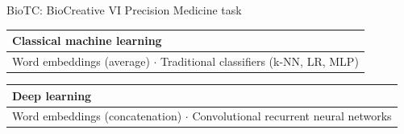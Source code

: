 \begin{frame}[t]{BioTC: BioCreative VI Precision Medicine task}

\renewcommand*{\arraystretch}{0.5}


\scriptsize

\begingroup
\begin{tabular}{l}
\textbf{Classical machine learning}\\
\midrule
Word embeddings (average) $\cdot$ Traditional classifiers (k-NN, LR, MLP)\\
\end{tabular}
\endgroup

\vspace*{6mm}

\begingroup
\begin{tabular}{l}
\textbf{Deep learning}\\
\midrule
Word embeddings (concatenation) $\cdot$ Convolutional recurrent neural networks\\
\end{tabular}
\endgroup

\vspace*{4mm}

\tiny %

\newcommand{\minorscriptsize}{\fontsize{7.0pt}{8.4pt}\selectfont}

\renewcommand*{\arraystretch}{1.0}
\setlength{\tabcolsep}{4pt}%

\begin{columns}[t,totalwidth=\textwidth]

\begin{column}{0.00\textwidth}%
\end{column}


\end{columns}
\end{frame}
